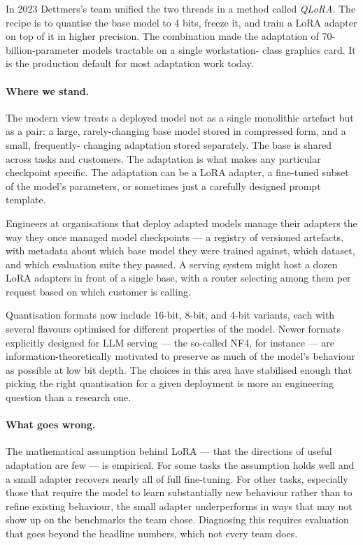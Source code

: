 In 2023 Dettmers's team unified the two threads in a method
called \emph{QLoRA}. The recipe is to quantise the base model
to 4 bits, freeze it, and train a LoRA adapter on top of it in
higher precision. The combination made the adaptation of
70-billion-parameter models tractable on a single workstation-
class graphics card. It is the production default for most
adaptation work today.

\paragraph{Where we stand.} The modern view treats a deployed model not as a single
monolithic artefact but as a pair: a large, rarely-changing
base model stored in compressed form, and a small, frequently-
changing adaptation stored separately. The base is shared
across tasks and customers. The adaptation is what makes any
particular checkpoint specific. The adaptation can be a LoRA
adapter, a fine-tuned subset of the model's parameters, or
sometimes just a carefully designed prompt template.

Engineers at organisations that deploy adapted models manage
their adapters the way they once managed model checkpoints --- a
registry of versioned artefacts, with metadata about which base
model they were trained against, which dataset, and which
evaluation suite they passed. A serving system might host a
dozen LoRA adapters in front of a single base, with a router
selecting among them per request based on which customer is
calling.

Quantisation formats now include 16-bit, 8-bit, and 4-bit
variants, each with several flavours optimised for different
properties of the model. Newer formats explicitly designed for
LLM serving --- the so-called NF4, for instance --- are
information-theoretically motivated to preserve as much of the
model's behaviour as possible at low bit depth. The choices in
this area have stabilised enough that picking the right
quantisation for a given deployment is more an engineering
question than a research one.

\paragraph{What goes wrong.} The mathematical assumption behind LoRA --- that the directions
of useful adaptation are few --- is empirical. For some tasks
the assumption holds well and a small adapter recovers nearly
all of full fine-tuning. For other tasks, especially those that
require the model to learn substantially new behaviour rather
than to refine existing behaviour, the small adapter
underperforms in ways that may not show up on the benchmarks
the team chose. Diagnosing this requires evaluation that goes
beyond the headline numbers, which not every team does.

